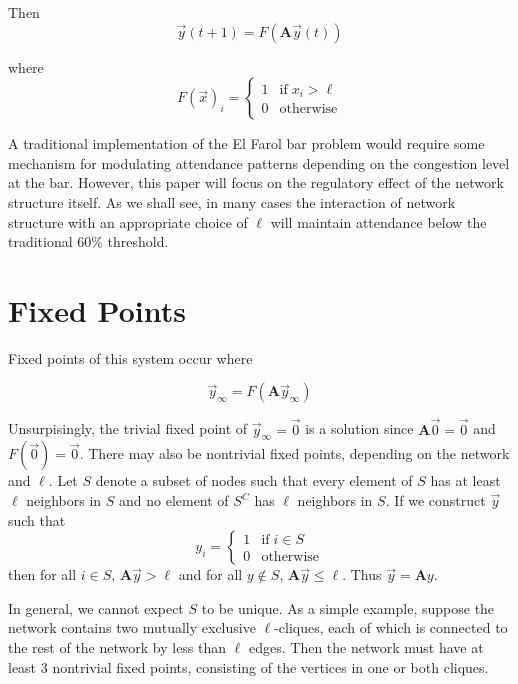 \documentclass[12pt]{article}
\begin{document}
Then 
\begin{equation}
  \vec{y}(t + 1) = F(\mathbf{A}\vec{y}(t))
\end{equation}

where
\begin{equation}
  F(\vec{x})_i = \begin{cases}
    1 &\text{if} \; x_i > \ell \\
    0 &\text{otherwise}
  \end{cases}
\end{equation}

A traditional implementation of the El Farol bar problem would require some mechanism for modulating attendance patterns depending on the congestion level at the bar.  However, this paper will focus on the regulatory effect of the network structure itself.  As we shall see, in many cases the interaction of network structure with an appropriate choice of $\ell$ will maintain attendance below the traditional 60\% threshold. 

\section{Fixed Points}

Fixed points of this system occur where

\begin{equation}
  \vec{y}_{\infty} = F(\mathbf{A}\vec{y}_{\infty})
\end{equation}

Unsurpisingly, the trivial fixed point of $\vec{y}_{\infty} = \vec{0}$ is a solution since $\mathbf{A}\vec{0} = \vec{0}$ and $F(\vec{0}) = \vec{0}$.  There may also be nontrivial fixed points, depending on the network and $\ell$.  Let $S$ denote a subset of nodes such that every element of $S$ has at least $\ell$ neighbors in $S$ and no element of $S^C$ has $\ell$ neighbors in $S$.  If we construct $\vec{y}$ such that  
\begin{equation}
  y_i = \begin{cases}
    1 &\text{if} \; i \in S \\
    0 &\text{otherwise}
  \end{cases}
\end{equation}
 then for all $i \in S$, $\mathbf{A}\vec{y} > \ell$ and for all $y \notin S$, $\mathbf{A}\vec{y} \leq \ell$.  Thus $\vec{y} = \mathbf{A}y$. 

In general, we cannot expect $S$ to be unique.  As a simple example, suppose the network contains two mutually exclusive $\ell$-cliques, each of which is connected to the rest of the network by less than $\ell$ edges.  Then the network must have at least 3 nontrivial fixed points, consisting of the vertices in one or both cliques.
\end{document}
